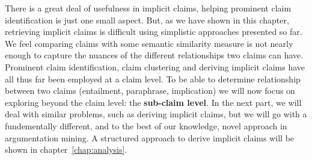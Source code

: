There is a great deal of usefulness in implicit claims, helping prominent claim
identification is just one small aspect. But, as we have shown in this chapter,
retrieving implicit claims is difficult using simplistic approaches presented
so far. We feel comparing claims with some semantic similarity measure is not 
nearly enough to capture the nuances of the different relationships two claims can have.
Prominent claim identification, claim clustering and deriving implicit
claims have all thus far been employed at a claim level. To be able to 
determine relationship between two claims (entailment, paraphrase, implication)
we will now focus on exploring beyond the claim level: the \textbf{sub-claim level}. 
In the next part, we will deal with similar problems, such as deriving
implicit claims, but we will go with a fundementally different, and to the best
of our knowledge, novel approach in argumentation mining. A structured approach
to derive implicit claims will be shown in chapter~\ref{chap:analysis}.
